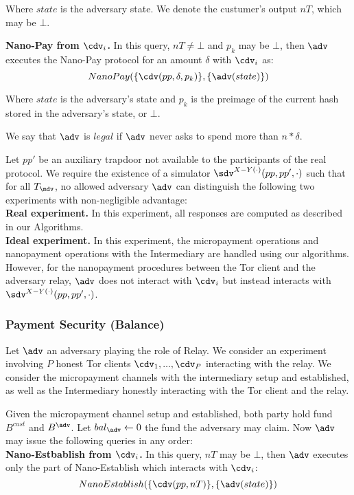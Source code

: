 Where $state$ is the adversary state. We denote the custumer's output $nT$, which may be $\bot$.


\textbf{Nano-Pay from $\cdv_i$.} In this query, $nT \neq \bot$ and $p_k$ may be $\bot$, then $\adv$ executes the Nano-Pay protocol for an amount $\delta$ with $\cdv_i$ as:
$$Nano\-Pay(\{\cdv(pp, \delta, p_k)\}, \{\adv(state)\})$$

Where $state$ is the adversary's state and $p_k$ is the preimage of the current hash stored in the adversary's state, or $\bot$.

We say that $\adv$ is $legal$ if $\adv$ never asks to spend more than $n*\delta$.

Let $pp'$ be an auxiliary trapdoor not available to the participants of the real protocol. We require the existence of a simulator $\sdv^{X-Y(\cdot)}(pp, pp', \cdot)$ such that for all $T_\mdv$, no allowed adversary $\adv$ can distinguish the following two experiments with non-negligible advantage:\\
\textbf{Real experiment.} In this experiment, all responses are computed as described in our Algorithms.\\
\textbf{Ideal experiment.} In this experiment, the micropayment operations and nanopayment operations with the Intermediary are handled using our algorithms. However, for the nanopayment procedures between the Tor client and the adversary relay, $\adv$ does not interact with $\cdv_i$ but instead interacts with $\sdv^{X-Y(\cdot)}(pp,pp',\cdot)$.

\subsubsection{Payment Security (Balance)}

Let $\adv$ an adversary playing the role of Relay. We consider an experiment involving $P$ honest Tor clients $\cdv_1,..., \cdv_P$ interacting with the relay. We consider the micropayment channels with the intermediary setup and established, as well as the Intermediary honestly interacting with the Tor client and the relay.

Given the micropayment channel setup and established, both party hold fund $B^{cust}$ and $B^{\adv}$. Let $bal_\adv \leftarrow 0$ the fund the adversary may claim. Now $\adv$ may issue the following queries in any order:\\

\textbf{Nano-Estbablish from $\cdv_i$.} In this query, $nT$ may be $\bot$, then $\adv$ executes only the part of Nano-Establish which interacts with $\cdv_i$:
$$Nano\-Establish(\{\cdv(pp, nT)\}, \{\adv(state)\})$$

